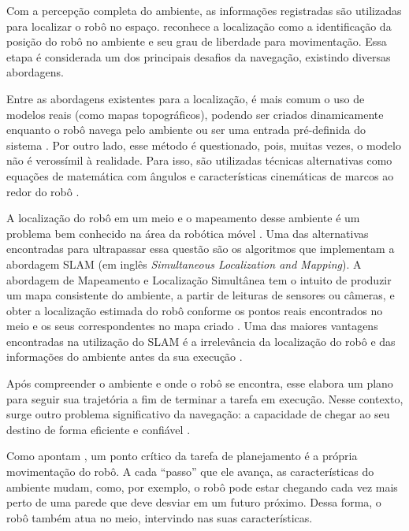 Com a percepção completa do ambiente, as informações registradas são utilizadas para localizar o robô no espaço. \citet{mobileRoboticsJaulin:2019} reconhece a localização como a identificação da posição do robô no ambiente e seu grau de liberdade para movimentação. Essa etapa é considerada um dos principais desafios da navegação, existindo diversas abordagens.

Entre as abordagens existentes para a localização, é mais comum o uso de modelos reais (como mapas topográficos), podendo ser criados dinamicamente enquanto o robô navega pelo ambiente ou ser uma entrada pré-definida do sistema \cite{mobileRobotsSiegwart:2011}. 
Por outro lado, esse método é questionado, pois, muitas vezes, o modelo não é verossímil à realidade. Para isso, são utilizadas técnicas alternativas como equações de matemática com ângulos e características cinemáticas de marcos ao redor do robô \cite{mobileRoboticsJaulin:2019}.

A localização do robô em um meio e o mapeamento desse ambiente é um problema bem conhecido na área da robótica móvel \cite{SLAMProblem:1991}. Uma das alternativas encontradas para ultrapassar essa questão são os algoritmos que implementam a abordagem SLAM (em inglês \textit{Simultaneous Localization and Mapping}). A abordagem de Mapeamento e Localização Simultânea tem o intuito de produzir um mapa consistente do ambiente, a partir de leituras de sensores ou câmeras, e obter a localização estimada do robô conforme os pontos reais encontrados no meio e os seus correspondentes no mapa criado \cite{SLAMDefinitionEvolution:2021, SLAMTutorialII:2006, SLAMReview:2015}. Uma das maiores vantagens encontradas na utilização do SLAM é a irrelevância da localização do robô e das informações do ambiente antes da sua execução \cite{SLAMReview:2015}.

Após compreender o ambiente e onde o robô se encontra, esse elabora um plano para seguir sua trajetória a fim de terminar a tarefa em execução.
Nesse contexto, surge outro problema significativo da navegação: a capacidade de chegar ao seu destino de forma eficiente e confiável \cite{mobileRobotsSiegwart:2011}.

Como apontam \citet{mobileRobotsSiegwart:2011}, um ponto crítico da tarefa de planejamento é a própria movimentação do robô. A cada “passo” que ele avança, as características do ambiente mudam, como, por exemplo, o robô pode estar chegando cada vez mais perto de uma parede que deve desviar em um futuro próximo. Dessa forma, o robô também atua no meio, intervindo nas suas características. 

